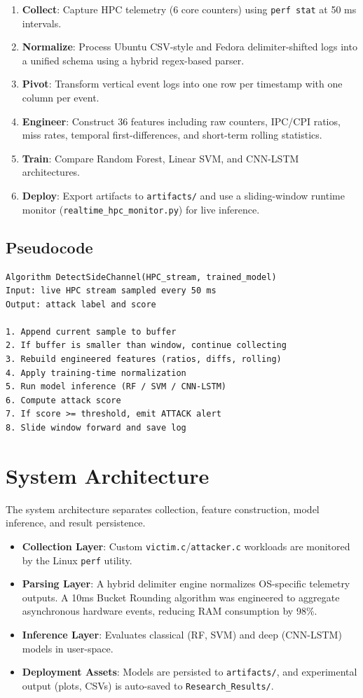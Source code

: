 \documentclass[conference]{IEEEtran}
\begin{document}
\begin{enumerate}
  \item \textbf{Collect}: Capture HPC telemetry (6 core counters) using \texttt{perf stat} at 50 ms intervals.
  \item \textbf{Normalize}: Process Ubuntu CSV-style and Fedora delimiter-shifted logs into a unified schema using a hybrid regex-based parser.
  \item \textbf{Pivot}: Transform vertical event logs into one row per timestamp with one column per event.
  \item \textbf{Engineer}: Construct 36 features including raw counters, IPC/CPI ratios, miss rates, temporal first-differences, and short-term rolling statistics.
  \item \textbf{Train}: Compare Random Forest, Linear SVM, and CNN-LSTM architectures.
  \item \textbf{Deploy}: Export artifacts to \texttt{artifacts/} and use a sliding-window runtime monitor (\texttt{realtime\_hpc\_monitor.py}) for live inference.
\end{enumerate}

\subsection{Pseudocode}
\begin{verbatim}
Algorithm DetectSideChannel(HPC_stream, trained_model)
Input: live HPC stream sampled every 50 ms
Output: attack label and score

1. Append current sample to buffer
2. If buffer is smaller than window, continue collecting
3. Rebuild engineered features (ratios, diffs, rolling)
4. Apply training-time normalization
5. Run model inference (RF / SVM / CNN-LSTM)
6. Compute attack score
7. If score >= threshold, emit ATTACK alert
8. Slide window forward and save log
\end{verbatim}

\section{System Architecture}
The system architecture separates collection, feature construction, model inference, and result persistence. 

\begin{itemize}
    \item \textbf{Collection Layer}: Custom \texttt{victim.c}/\texttt{attacker.c} workloads are monitored by the Linux \texttt{perf} utility.
    \item \textbf{Parsing Layer}: A hybrid delimiter engine normalizes OS-specific telemetry outputs. A 10ms Bucket Rounding algorithm was engineered to aggregate asynchronous hardware events, reducing RAM consumption by 98\%.
    \item \textbf{Inference Layer}: Evaluates classical (RF, SVM) and deep (CNN-LSTM) models in user-space.
    \item \textbf{Deployment Assets}: Models are persisted to \texttt{artifacts/}, and experimental output (plots, CSVs) is auto-saved to \texttt{Research\_Results/}.
\end{itemize}
\end{document}
